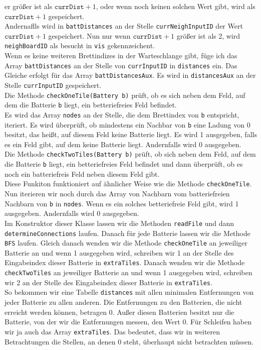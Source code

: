 \documentclass[a4paper,10pt,ngerman]{scrartcl}
\begin{document}
er größer ist als $\texttt{currDist} + 1$, oder wenn noch keinen solchen Wert gibt, wird als $\texttt{currDist} + 1$
gespeichert.\\
Andernaflls wird in \texttt{battDistances} an der Stelle \texttt{currNeighInputID} der Wert $\texttt{currDist} + 1$ gespeichert.
Nun nur wenn $\texttt{currDist} + 1$ größer ist als 2, wird \texttt{neighBoardID} als besucht in \texttt{vis} gekennzeichent.\\
Wenn es keine weiteren Brettindizes in der Warteschlange gibt, füge ich das Array \texttt{battDistances}
an der Stelle von \texttt{currInputID} in \texttt{distances} ein.
Das Gleiche erfolgt für das Array \texttt{battDistancesAux}. Es wird in \texttt{distancesAux} an der Stelle
\texttt{currInputID} gespeichert.\\

Die Methode \texttt{checkOneTile(Battery b)} prüft, ob es sich neben dem Feld, auf dem die Batterie \texttt{b}
liegt, ein betteriefreies Feld befindet.\\
Es wird das Array \texttt{nodes} an der Stelle, die dem Brettindex von \texttt{b} entspricht, iteriert.
Es wird überprüft, ob mindestens ein Nachbar von \texttt{b} eine Ladung von 0 besitzt, das heißt, auf
diesem Feld keine Batterie liegt. Es wird 1 ausgegeben, falls es ein Feld gibt, auf dem keine Batterie liegt.
Andernfalls wird 0 ausgegeben.\\

Die Methode \texttt{checkTwoTiles(Battery b)} prüft, ob sich neben dem Feld, auf dem die Batterie \texttt{b}
liegt, ein betteriefreies Feld befindet und dann überprüft, ob es noch ein batteriefreis Feld neben diesem
Feld gibt.\\
Diese Funkiton funktioniert auf ähnlicher Weise wie die Methode \texttt{checkOneTile}.
Nun iterieren wir noch durch das Array von Nachbarn vom batteriefreien Nachbarn von \texttt{b} in \texttt{nodes}.
Wenn es ein solches betteriefreie Feld gibt, wird 1 ausgegeben. Andernfalls wird 0 ausgegeben.\\

Im Konstruktor dieser Klasse lassen wir die Methoden \texttt{readFile} und dann \texttt{determineConnections}
laufen. Danach für jede Batterie lassen wir die Methode \texttt{BFS} laufen.
Gleich danach wenden wir die Methode \texttt{checkOneTile} an jeweiliger Batterie an und wenn
1 ausgegeben wird, schreiben wir 1 an der Stelle des Eingabeindex dieser Batterie in \texttt{extraTiles}.
Danach wenden wir die Methode \texttt{checkTwoTiles} an jeweiliger Batterie an und wenn
1 ausgegeben wird, schreiben wir 2 an der Stelle des Eingabeindex dieser Batterie in \texttt{extraTiles}.\\
So bekommen wir eine Tabelle \texttt{distances} mit allen minimalen Entfernungen von
jeder Batterie zu allen anderen. Die Entfernungen zu den Batterien, die nicht erreicht werden können, betragen 0.
Außer diesen Batterien besitzt nur die Batterie, von der wir die Entfernungen messen, den Wert 0.
Für Schleifen haben wir ja auch das Array \texttt{extraTiles}. Das bedeutet, dass wir in weiteren Betrachtungen
die Stellen, an denen 0 steht, überhaupt nicht betrachten müssen.
\end{document}
